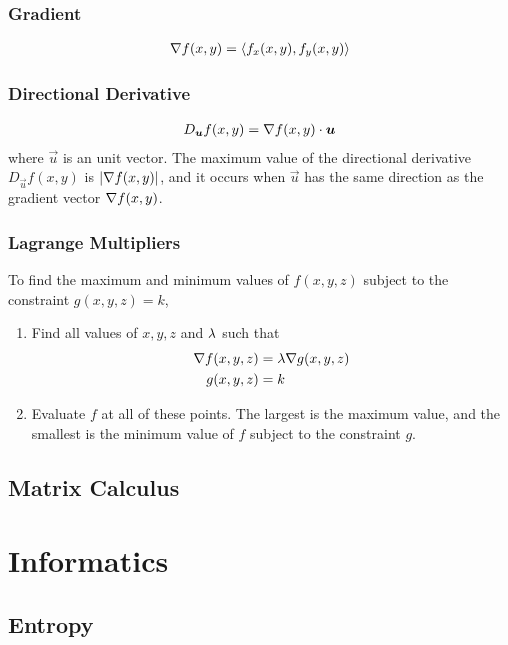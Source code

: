 \subsubsection*{Gradient}

\begin{align*}
	\nabla f(x,y)=\langle f_x(x,y),f_y(x,y)\rangle
\end{align*}

\subsubsection*{Directional Derivative}

\begin{align*}
	D_{\boldsymbol{u}}f(x,y)=\nabla f(x,y)\cdot\boldsymbol{u}
\end{align*}
where $\vec{u}$ is an unit vector. The maximum value of the directional derivative $D_{\vec{u}}f(x,y)$ is $\left\vert\nabla f(x,y)\right\vert$, and it occurs when $\vec{u}$ has the same direction as the gradient vector $\nabla f(x,y)$.

\subsubsection*{Lagrange Multipliers}

To find the maximum and minimum values of $f(x,y,z)$ subject to the constraint $g(x,y,z)=k$,
\begin{enumerate}
	\item Find all values of $x,y,z$ and $\lambda$ such that
	\begin{align*}
		\nabla f(x,y,z)&=\lambda\nabla g(x,y,z) \\
		g(x,y,z)&=k
	\end{align*}
	\item Evaluate $f$ at all of these points. The largest is the maximum value, and the smallest is the minimum value of $f$ subject to the constraint $g$.
\end{enumerate}

\subsection{Matrix Calculus}

\section{Informatics}
\label{section2.4}

\subsection{Entropy}

